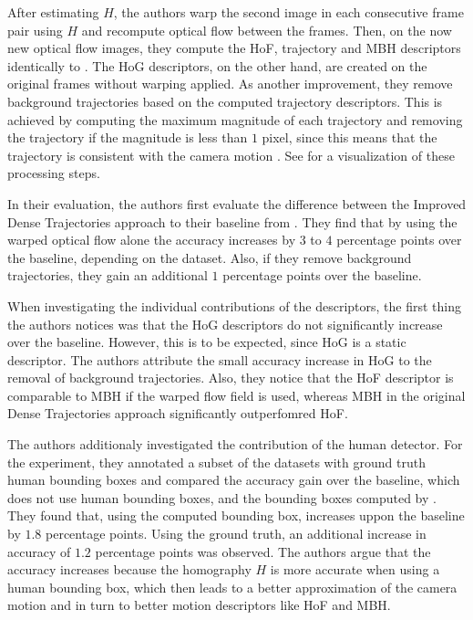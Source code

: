 After estimating $H$, the authors warp the second image in each consecutive frame pair using $H$ and recompute optical flow between the frames.
Then, on the now new optical flow images, they compute the HoF, trajectory and MBH descriptors identically to \cite{wang_dense_2013}.
The HoG descriptors, on the other hand, are created on the original frames without warping applied.
As another improvement, they remove background trajectories based on the computed trajectory descriptors.
This is achieved by computing the maximum magnitude of each trajectory and removing the trajectory if the magnitude is less than $1$ pixel, since this means that the trajectory is consistent with the camera motion \cite{wang_action_2013}.
See  for a visualization of these processing steps.

In their evaluation, the authors first evaluate the difference between the Improved Dense Trajectories approach to their baseline from \cite{wang_dense_2013}.
They find that by using the warped optical flow alone the accuracy increases by $3$ to $4$ percentage points over the baseline, depending on the dataset.
Also, if they remove background trajectories, they gain an additional $1$ percentage points over the baseline.

When investigating the individual contributions of the descriptors, the first thing the authors notices was that the HoG descriptors do not significantly increase over the baseline.
However, this is to be expected, since HoG is a static descriptor.
The authors attribute the small accuracy increase in HoG to the removal of background trajectories.
Also, they notice that the HoF descriptor is comparable to MBH if the warped flow field is used, whereas MBH in the original Dense Trajectories approach significantly outperfomred HoF.

The authors additionaly investigated the contribution of the human detector.
For the experiment, they annotated a subset of the datasets with ground truth human bounding boxes and compared the accuracy gain over the baseline, which does not use human bounding boxes, and the bounding boxes computed by \cite{prest_weakly_2012}.
They found that, using the computed bounding box, increases uppon the baseline by $1.8$ percentage points.
Using the ground truth, an additional increase in accuracy of $1.2$ percentage points was observed.
The authors argue that the accuracy increases because the homography $H$ is more accurate when using a human bounding box, which then leads to a better approximation of the camera motion and in turn to better motion descriptors like HoF and MBH.

